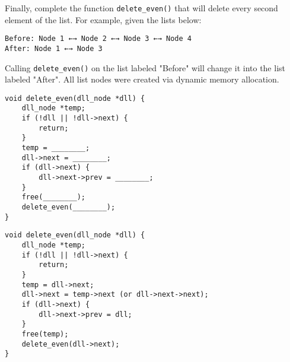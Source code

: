 \begin{blocksection}
\question
Finally, complete the function \lstinline$delete_even()$ that will delete every second element of the list. For example, given the lists below:

\begin{verbatim}
Before: Node 1 ←→ Node 2 ←→ Node 3 ←→ Node 4 
After: Node 1 ←→ Node 3
\end{verbatim}

Calling \lstinline$delete_even()$ on the list labeled "Before" will change it into the list labeled "After". All list nodes were created via dynamic memory allocation.

\begin{verbatim}
void delete_even(dll_node *dll) {
    dll_node *temp; 
    if (!dll || !dll->next) {
        return;
    }
    temp = ________;
    dll->next = ________;
    if (dll->next) {
        dll->next->prev = ________;
    }
    free(________);
    delete_even(________);
}
\end{verbatim}

\begin{solution}
\begin{verbatim}
void delete_even(dll_node *dll) {
    dll_node *temp; 
    if (!dll || !dll->next) {
        return;
    }
    temp = dll->next;
    dll->next = temp->next (or dll->next->next);
    if (dll->next) {
        dll->next->prev = dll;
    }
    free(temp);
    delete_even(dll->next);
}
\end{verbatim}
\end{solution}

\end{blocksection}